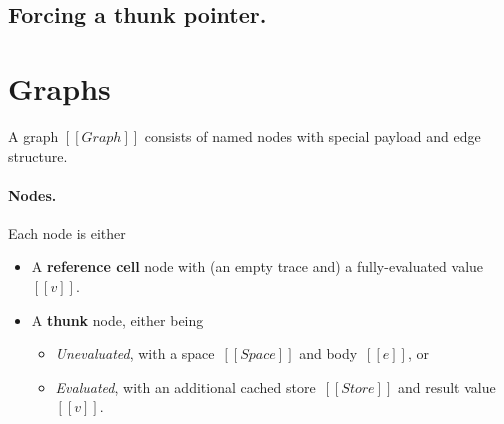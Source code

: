 \documentclass[11pt]{article}
\begin{document}
\begin{mathpar}
\end{mathpar}

\subsection{Forcing a thunk pointer.}

\begin{mathpar}
\end{mathpar}


\section{Graphs}

A graph $[[Graph]]$ consists of named nodes with special payload and edge
structure.
  
\ottgrammartabular{
  \ottGraph
}

\ottgrammartabular{
  \ottppp
  \\
  \ottnode
  \\
  \ottcache
  \\
  \ottt
  \\
  \ottedge
  \\
  \ottA
  \\
  \ottb
}

\paragraph{Nodes.}

Each node is either

\begin{itemize}
\item A \textbf{reference cell} node with (an empty trace and) a fully-evaluated value~$[[v]]$.
\item A \textbf{thunk} node, either being
  \begin{itemize}
  \item \emph{Unevaluated}, with a space~$[[Space]]$ and body~$[[e]]$, or
  \item \emph{Evaluated}, with an additional cached store~$[[Store]]$ and result value~$[[v]]$.
  \end{itemize} 
\end{itemize}
\end{document}
